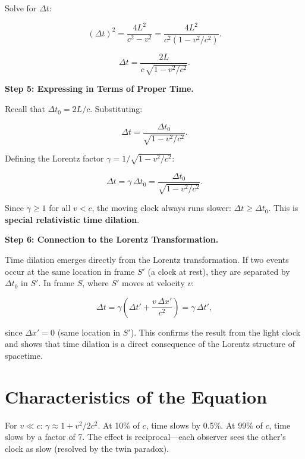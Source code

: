 Solve for $\Delta t$:

\begin{equation}
(\Delta t)^2 = \frac{4L^2}{c^2 - v^2} = \frac{4L^2}{c^2\left(1 - v^2/c^2\right)}.
\end{equation}

\begin{equation}
\Delta t = \frac{2L}{c\,\sqrt{1 - v^2/c^2}}.
\end{equation}

\textbf{Step 5: Expressing in Terms of Proper Time.}

Recall that $\Delta t_0 = 2L/c$. Substituting:

\begin{equation}
\Delta t = \frac{\Delta t_0}{\sqrt{1 - v^2/c^2}}.
\end{equation}

Defining the Lorentz factor $\gamma = 1/\sqrt{1 - v^2/c^2}$:

\begin{equation}
\boxed{\Delta t = \gamma\,\Delta t_0 = \frac{\Delta t_0}{\sqrt{1 - v^2/c^2}}.}
\end{equation}

Since $\gamma \geq 1$ for all $v < c$, the moving clock always runs slower: $\Delta t \geq \Delta t_0$. This is \textbf{special relativistic time dilation}.

\textbf{Step 6: Connection to the Lorentz Transformation.}

Time dilation emerges directly from the Lorentz transformation. If two events occur at the same location in frame $S'$ (a clock at rest), they are separated by $\Delta t_0$ in $S'$. In frame $S$, where $S'$ moves at velocity $v$:

\begin{equation}
\Delta t = \gamma\left(\Delta t' + \frac{v\,\Delta x'}{c^2}\right) = \gamma\,\Delta t',
\end{equation}

since $\Delta x' = 0$ (same location in $S'$). This confirms the result from the light clock and shows that time dilation is a direct consequence of the Lorentz structure of spacetime.

\section*{Characteristics of the Equation}

For $v \ll c$: $\gamma \approx 1 + v^2/2c^2$. At 10\% of $c$, time slows by 0.5\%. At 99\% of $c$, time slows by a factor of 7. The effect is reciprocal---each observer sees the other's clock as slow (resolved by the twin paradox).
